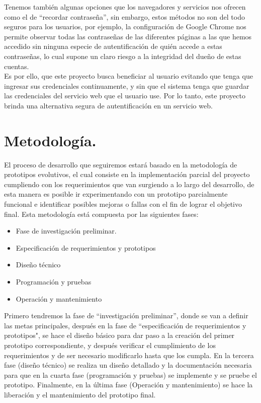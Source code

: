 \documentclass[12pt, a4paper, titlepage]{report}
\begin{document}
        Tenemos también algunas opciones que los navegadores y servicios nos ofrecen como el de “recordar contraseña”, sin embargo, estos métodos no son del todo seguros para los usuarios, por ejemplo, la configuración de Google Chrome nos permite observar todas las contraseñas de las diferentes páginas a las que hemos accedido sin ninguna especie de autentificación de quién accede a estas contraseñas, lo cual supone un claro riesgo a la integridad del dueño de estas cuentas.\\
        
        Es por ello, que este proyecto busca beneficiar al usuario evitando que tenga que ingresar sus credenciales continuamente, y sin que el sistema tenga que guardar las credenciales del servicio web que el usuario use. Por lo tanto, este proyecto brinda una alternativa segura de autentificación en un servicio web. \\
	    \newpage
	    
	\section{Metodolog\'ia.}
		El proceso de desarrollo que seguiremos estará basado en la metodología de prototipos evolutivos, el cual consiste en la implementación parcial del proyecto cumpliendo con los requerimientos que van surgiendo a lo largo del desarrollo, de esta manera es posible ir experimentando con un prototipo parcialmente funcional e identificar posibles mejoras o fallas con el fin de lograr el objetivo final.
		Esta metodología está compuesta por las siguientes fases:
		\begin{itemize}
		    \item Fase de investigación preliminar.
		    \item Especificación de requerimientos y prototipos
		    \item Diseño técnico
		    \item Programación y pruebas
		    \item Operación y mantenimiento
		\end{itemize}
		
        
        Primero tendremos la fase de “investigación preliminar”, donde se van a definir las metas principales, después en la fase de “especificación de requerimientos y prototipos", se hace el diseño básico para dar paso a la creación del primer prototipo correspondiente, y después verificar el cumplimiento de los requerimientos y de ser necesario modificarlo hasta que los cumpla. En la tercera fase (diseño técnico) se realiza un diseño detallado y la documentación necesaria para que en la cuarta fase (programación y pruebas) se implemente y se pruebe el prototipo. Finalmente, en la última fase (Operación y mantenimiento) se hace la liberación y el mantenimiento del prototipo final.
        
\end{document}
